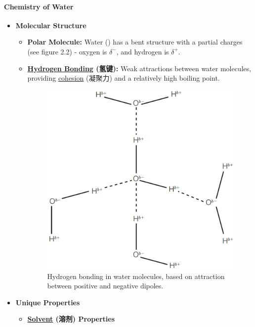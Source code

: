 \paragraph{Chemistry of Water}
\begin{itemize}
    \item \textbf{Molecular Structure}
    \begin{itemize}
        \item \textbf{Polar Molecule:} Water () has a bent structure with a partial charges (see figure 2.2) - oxygen is
        $\delta^-$, and hydrogen is $\delta^+$.
        \item \textbf{\underline{Hydrogen Bonding} (氢键):} Weak attractions between water molecules, providing
        \underline{cohesion} (凝聚力) and a relatively high boiling point.
        \begin{figure}[H]
            \centering
            \includegraphics[scale=0.3]{Biology/1A/Images/1A-1-5.png}
            \caption{Hydrogen bonding in water molecules, based on attraction between positive and negative dipoles.}
        \end{figure}
    \end{itemize}
    \item \textbf{Unique Properties}
    \begin{itemize}
        \item \textbf{\underline{Solvent} (溶剂) Properties}
        \begin{itemize}

\end{itemize}
\end{itemize}
\end{itemize}
